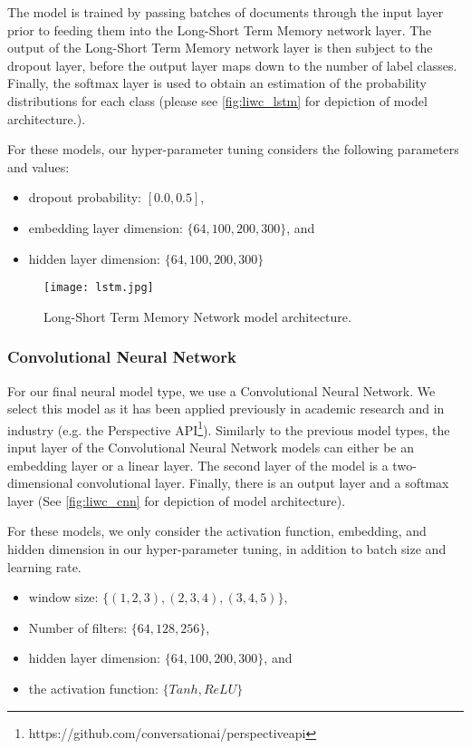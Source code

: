 The model is trained by passing batches of documents through the input layer prior to feeding them into the Long-Short Term Memory network layer. The output of the Long-Short Term Memory network layer is then subject to the dropout layer, before the output layer maps down to the number of label classes. Finally, the softmax layer is used to obtain an estimation of the probability distributions for each class (please see \autoref{fig:liwc_lstm} for depiction of model architecture.).

For these models, our hyper-parameter tuning considers the following parameters and values:

\begin{itemize}
  \item dropout probability: $[0.0, 0.5]$,
  \item embedding layer dimension: $\{64, 100, 200, 300\}$, and
  \item hidden layer dimension: $\{64, 100, 200, 300\}$
\end{itemize}

\begin{figure}
  \centering
  \texttt{[image: lstm.jpg]}
  \caption{Long-Short Term Memory Network model architecture.}
  \label{fig:liwc_lstm}
\end{figure}

\subsubsection{Convolutional Neural Network}

For our final neural model type, we use a Convolutional Neural Network. We select this model as it has been applied previously in academic research \cite{CITE: CNN papers} and in industry (e.g. the Perspective API\footnote{https://github.com/conversationai/perspectiveapi}). Similarly to the previous model types, the input layer of the Convolutional Neural Network models can either be an embedding layer or a linear layer. The second layer of the model is a two-dimensional convolutional layer. Finally, there is an output layer and a softmax layer (See \autoref{fig:liwc_cnn} for depiction of model architecture).

For these models, we only consider the activation function, embedding, and hidden dimension in our hyper-parameter tuning, in addition to batch size and learning rate.

\begin{itemize}
  \item window size: $\{(1, 2, 3), (2, 3, 4), (3, 4, 5)\}$,
  \item Number of filters: $\{64, 128, 256\}$,
  \item hidden layer dimension: $\{64, 100, 200, 300\}$, and
  \item the activation function: $\{Tanh, ReLU\}$
\end{itemize}

